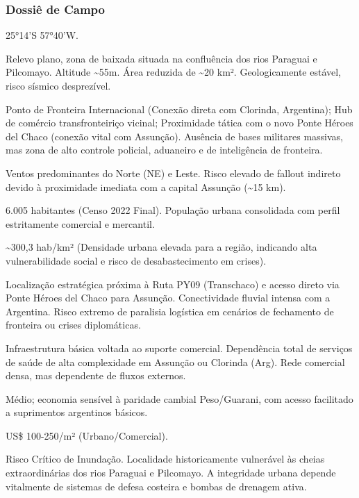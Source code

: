 \subsubsection{Dossiê de Campo}
\begin{description}[style=nextline,leftmargin=0.5cm,font=\bfseries]
\item[Coordenadas]  25°14'S 57°40'W.
\item[Topografia]  Relevo plano, zona de baixada situada na confluência dos rios Paraguai e Pilcomayo. Altitude \textasciitilde 55m. Área reduzida de \textasciitilde 20 km². Geologicamente estável, risco sísmico desprezível.
\item[Alvos Estratégicos]  Ponto de Fronteira Internacional (Conexão direta com Clorinda, Argentina); Hub de comércio transfronteiriço vicinal; Proximidade tática com o novo Ponte Héroes del Chaco (conexão vital com Assunção). Ausência de bases militares massivas, mas zona de alto controle policial, aduaneiro e de inteligência de fronteira.
\item[Fallout]  Ventos predominantes do Norte (NE) e Leste. Risco elevado de fallout indireto devido à proximidade imediata com a capital Assunção (\textasciitilde 15 km).
\item[População]  6.005 habitantes (Censo 2022 Final). População urbana consolidada com perfil estritamente comercial e mercantil.
\item[Densidade]  \textasciitilde 300,3 hab/\allowbreak km² (Densidade urbana elevada para a região, indicando alta vulnerabilidade social e risco de desabastecimento em crises).
\item[Vias de Acesso]  Localização estratégica próxima à Ruta PY09 (Transchaco) e acesso direto via Ponte Héroes del Chaco para Assunção. Conectividade fluvial intensa com a Argentina. Risco extremo de paralisia logística em cenários de fechamento de fronteira ou crises diplomáticas.
\item[Serviços]  Infraestrutura básica voltada ao suporte comercial. Dependência total de serviços de saúde de alta complexidade em Assunção ou Clorinda (Arg). Rede comercial densa, mas dependente de fluxos externos.
\item[Custo de Vida]  Médio; economia sensível à paridade cambial Peso/\allowbreak Guarani, com acesso facilitado a suprimentos argentinos básicos.
\item[Preço da Terra]  US\$ 100-250/\allowbreak m² (Urbano/\allowbreak Comercial).
\item[Hidrologia]  Risco Crítico de Inundação. Localidade historicamente vulnerável às cheias extraordinárias dos rios Paraguai e Pilcomayo. A integridade urbana depende vitalmente de sistemas de defesa costeira e bombas de drenagem ativa.

\end{description}
